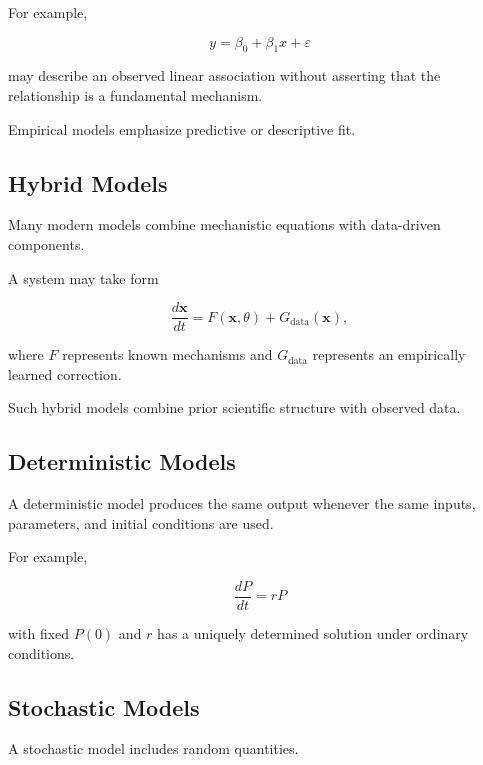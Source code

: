 For example,

\[
\boxed{
y
=
\beta_0+\beta_1x+\varepsilon
}
\]

may describe an observed linear association without asserting that the
relationship is a fundamental mechanism.

Empirical models emphasize predictive or descriptive fit.

\subsection{Hybrid Models}
\label{subsec:hybrid-models}

Many modern models combine mechanistic equations with data-driven
components.

A system may take form

\[
\boxed{
\frac{d\mathbf{x}}{dt}
=
F(\mathbf{x},\theta)
+
G_{\text{data}}(\mathbf{x}),
}
\]

where \(F\) represents known mechanisms and \(G_{\text{data}}\) represents
an empirically learned correction.

Such hybrid models combine prior scientific structure with observed data.

\subsection{Deterministic Models}
\label{subsec:deterministic-models}

A deterministic model produces the same output whenever the same inputs,
parameters, and initial conditions are used.

For example,

\[
\boxed{
\frac{dP}{dt}=rP
}
\]

with fixed \(P(0)\) and \(r\) has a uniquely determined solution under
ordinary conditions.

\subsection{Stochastic Models}
\label{subsec:stochastic-models}

A stochastic model includes random quantities.

